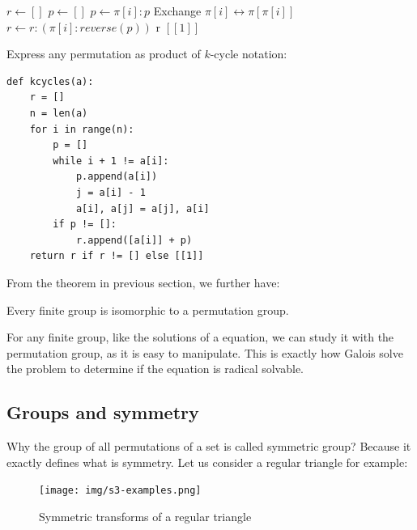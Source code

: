 \documentclass[b5paper]{article}
\begin{document}
\begin{algorithmic}
  \State $r \gets []$
    \State $p \gets []$
      \State $p \gets \pi[i]:p$
      \State Exchange $\pi[i] \leftrightarrow \pi[\pi[i]]$
    \EndWhile
      \State $r \gets r:(\pi[i]:reverse(p))$
    \EndIf
  \EndFor
    \State \Return r
  \Else
    \State \Return $[[1]]$ 
  \EndIf
\EndFunction
\end{algorithmic}

Express any permutation as product of $k$-cycle notation:

\lstset{language=Python}
\begin{lstlisting}
def kcycles(a):
    r = []
    n = len(a)
    for i in range(n):
        p = []
        while i + 1 != a[i]:
            p.append(a[i])
            j = a[i] - 1
            a[i], a[j] = a[j], a[i]
        if p != []:
            r.append([a[i]] + p)
    return r if r != [] else [[1]]
\end{lstlisting}

From the theorem in previous section, we further have:

\begin{theorem}
Every finite group is isomorphic to a permutation group.
\end{theorem}

For any finite group, like the solutions of a equation, we can study it with the permutation group, as it is easy to manipulate. This is exactly how Galois solve the problem to determine if the equation is radical solvable.

\begin{Exercise}
\end{Exercise}

\subsection{Groups and symmetry}

Why the group of all permutations of a set is called symmetric group? Because it exactly defines what is symmetry. Let us consider a regular triangle for example:

\begin{figure}[htbp]
 \centering
 \texttt{[image: img/s3-examples.png]}
 \caption{Symmetric transforms of a regular triangle}
 \label{fig:S3-examples}
\end{figure}
\end{document}
